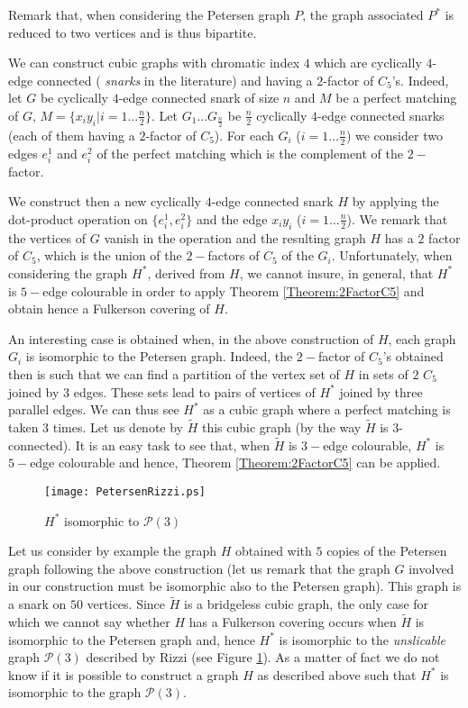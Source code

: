 \documentclass{amsart}
\theoremstyle{definition}
\theoremstyle{remark}
\begin{document}
Remark that, when considering the Petersen graph  $P$, the graph
associated $P^{*}$ is reduced to two vertices and is thus bipartite.

We can construct  cubic graphs with chromatic index $4$  which are cyclically $4$- edge connected ({\em
snarks} in the literature)
and having a $2$-factor of $C_5$'s. Indeed, let $G$ be cyclically
$4$-edge connected snark of size $n$ and $M$ be a perfect matching
of $G$, $M=\{x_iy_i | i=1\ldots \frac{n}{2}\}$. Let $G_1\ldots
G_{\frac{n}{2}}$ be $\frac{n}{2}$
 cyclically $4$-edge connected snarks (each of them having a
$2$-factor of $C_{5}$). For each $G_i$ ($i=1\ldots \frac{n}{2}$) we
consider two edges $e_i^1$ and $e_i^2$ of the perfect
matching which is the complement of the $2-$factor.

We construct then a new cyclically $4$-edge connected snark $H$  by
applying the dot-product operation on $\{e_i^1,e_i^2\}$ and the edge $x_iy_i$ ($i=1\ldots
\frac{n}{2}$). We remark that the vertices of $G$ vanish in the
operation and the resulting graph $H$ has a $2$ factor of $C_5$,
 which is the union of the $2-$factors of $C_{5}$ of the
$G_{i}$. Unfortunately, when considering the graph $H^{*}$, derived
from $H$, we cannot insure, in general, that $H^{*}$ is $5-$edge
colourable in order to apply Theorem \ref{Theorem:2FactorC5} and
obtain hence a Fulkerson covering of $H$.

An interesting case is obtained when, in the above construction of
$H$, each graph $G_{i}$ is isomorphic to the Petersen graph. Indeed,
the $2-$factor of $C_5$'s obtained then is such that we can find a
partition of the vertex set of $H$ in sets of $2$ $C_{5}$ joined
by $3$ edges. These sets lead to pairs of vertices of $H^{*}$ joined
by three parallel edges. We can thus see $H^{*}$ as a cubic graph
where a perfect matching is taken $3$ times. Let us denote by
$\tilde{H}$ this cubic graph (by the way $\tilde{H}$ is
$3$-connected). It is an easy task to see that, when $\tilde{H}$ is
$3-$edge colourable, $H^{*}$ is $5-$edge colourable and hence,
Theorem \ref{Theorem:2FactorC5} can be applied.

\begin{figure}
\texttt{[image: PetersenRizzi.ps]}
 \caption{$H^{*}$ isomorphic to $\mathcal
P(3)$} \label{Figure:UnslicableP3}
\end{figure}

Let us consider by example the graph $H$ obtained with $5$ copies of
the Petersen graph following the above construction (let us remark
that the graph  $G$ involved in our construction  must be isomorphic
also to the Petersen graph). This graph is a snark on $50$ vertices.
Since $\tilde{H}$ is a bridgeless cubic graph, the only case for
which we cannot say whether $H$ has a Fulkerson covering occurs when
$\tilde{H}$ is isomorphic to the Petersen graph and, hence $H^{*}$
is isomorphic to the {\em unslicable} graph $\mathcal P(3)$
described by Rizzi \cite{Riz99} (see Figure
\ref{Figure:UnslicableP3}). As a matter of fact we do not know if it is possible to construct a graph $H$ as described above such that $H^*$ is isomorphic to the graph $\mathcal P(3)$.
\end{document}
